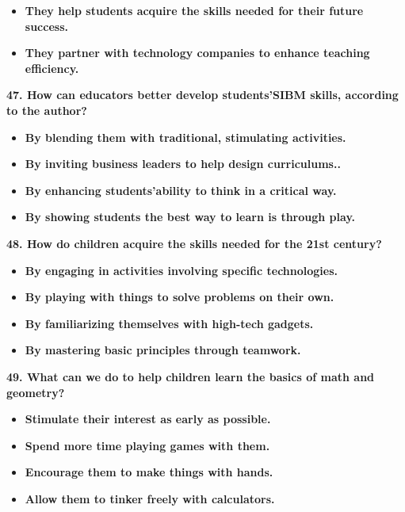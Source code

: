 \documentclass[UTF8,11pt]{ctexart}
\begin{document}
\begin{itemize}[leftmargin=2em,itemsep=.2em,topsep=.4em]\item[C.] \textbf{They help students acquire the skills needed for their future success.}
\item[D.] \textbf{They partner with technology companies to enhance teaching efficiency.}
\end{itemize}

\textbf{47. How can educators better develop students'SIBM skills, according to the author?}


\begin{itemize}[leftmargin=2em,itemsep=.2em,topsep=.4em]\item[A.] \textbf{By blending them with traditional, stimulating activities.}
\item[B.] \textbf{By inviting business leaders to help design curriculums..}
\item[C.] \textbf{By enhancing students'ability to think in a critical way.}
\item[D.] \textbf{By showing students the best way to learn is through play.}
\end{itemize}

\textbf{48. How do children acquire the skills needed for the 21st century?}


\begin{itemize}[leftmargin=2em,itemsep=.2em,topsep=.4em]\item[A.] \textbf{By engaging in activities involving specific technologies.}
\item[B.] \textbf{By playing with things to solve problems on their own.}
\item[C.] \textbf{By familiarizing themselves with high-tech gadgets.}
\item[D.] \textbf{By mastering basic principles through teamwork.}
\end{itemize}

\textbf{49. What can we do to help children learn the basics of math and geometry?}


\begin{itemize}[leftmargin=2em,itemsep=.2em,topsep=.4em]\item[A.] \textbf{Stimulate their interest as early as possible.}
\item[B.] \textbf{Spend more time playing games with them.}
\item[C.] \textbf{Encourage them to make things with hands.}
\item[D.] \textbf{Allow them to tinker freely with calculators.}
\end{itemize}
\end{document}
